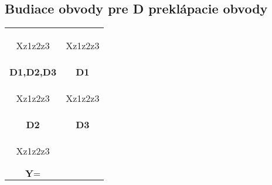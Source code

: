 \documentclass{article}
\begin{document}
\subsection{Budiace obvody pre D preklápacie obvody}
\begin{longtable}{c c}
\begin{Karnaugh}{Xz1}{z2z3}
\contingut{}
\end{Karnaugh}
&
\begin{Karnaugh}{Xz1}{z2z3}
\contingut{}
\end{Karnaugh}
\\
\textbf{D1,D2,D3}&\textbf{D1}\\
\begin{Karnaugh}{Xz1}{z2z3}
\contingut{}
\end{Karnaugh}
&
\begin{Karnaugh}{Xz1}{z2z3}
\contingut{}
\end{Karnaugh}
\\
\textbf{D2}&\textbf{D3}\\
\begin{Karnaugh}{Xz1}{z2z3}
\contingut{}
\end{Karnaugh}
&\\
$\textbf{Y}=$&
\end{longtable}
\end{document}
